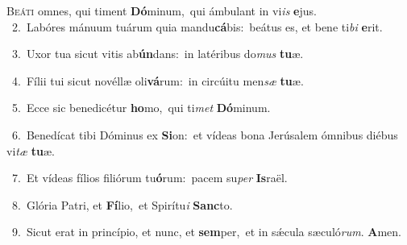 \lettrine{\initial\textcolor{\initialcolor}{B}}{eáti} omnes, qui timent \textbf{Dó}\-minum,~\star qui ámbulant in vi\textit{is} \textbf{e}\-jus.\\
{\numbfont\textcolor{\numbcolor}{~2.}}~Labóres mánuum tuárum quia mandu\-\textbf{cá}\-bis:~\star beátus es, et bene ti\textit{bi} \textbf{e}\-rit.\par
{\numbfont\textcolor{\numbcolor}{~3.}}~Uxor tua sicut vitis ab\-\textbf{ún}\-dans:~\star in latéribus do\textit{mus} \textbf{tu}\-æ.\par
{\numbfont\textcolor{\numbcolor}{~4.}}~Fílii tui sicut novéllæ oli\-\textbf{vá}\-rum:~\star in circúitu men\textit{sæ} \textbf{tu}\-æ.\par
{\numbfont\textcolor{\numbcolor}{~5.}}~Ecce sic benedicétur \textbf{ho}\-mo,~\star qui ti\textit{met} \textbf{Dó}\-minum.\par
{\numbfont\textcolor{\numbcolor}{~6.}}~Benedícat tibi Dóminus ex \textbf{Si}\-on:~\star et vídeas bona Jerúsalem ómnibus diébus vi\textit{tæ} \textbf{tu}\-æ.\par
{\numbfont\textcolor{\numbcolor}{~7.}}~Et vídeas fílios filiórum tu\-\textbf{ó}\-rum:~\star pacem su\textit{per} \textbf{Is}\-raël.\par
{\numbfont\textcolor{\numbcolor}{~8.}}~Glória Patri, et \textbf{Fí}\-lio,~\star et Spirítu\textit{i} \textbf{Sanc}\-to.\par
{\numbfont\textcolor{\numbcolor}{~9.}}~Sicut erat in princípio, et nunc, et \textbf{sem}\-per,~\star et in sǽcula sæculó\-\textit{rum}\-. \textbf{A}\-men.\par
